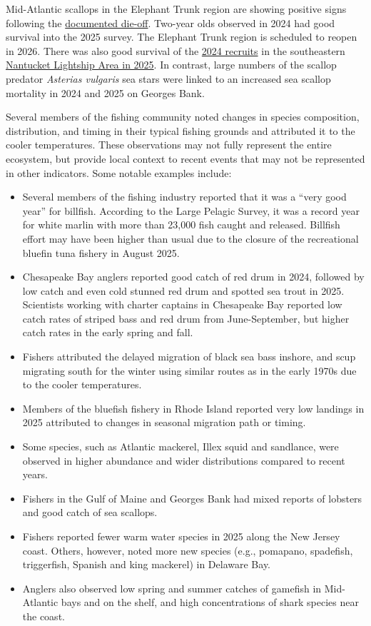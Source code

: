 \documentclass[
  10pt,
]{article}
\providecommand{\tightlist}{%
  \setlength{\itemsep}{0pt}\setlength{\parskip}{0pt}}
\begin{document}
Mid-Atlantic scallops in the Elephant Trunk region are showing positive signs following the \href{https://noaa-edab.github.io/catalog/observation_synthesis_2023.html}{documented die-off}. Two-year olds observed in 2024 had good survival into the 2025 survey. The Elephant Trunk region is scheduled to reopen in 2026. There was also good survival of the \href{https://noaa-edab.github.io/catalog/observation_synthesis_2024.html}{2024 recruits} in the southeastern \href{https://noaa-edab.github.io/catalog/observation_synthesis_2025.html}{Nantucket Lightship Area in 2025}. In contrast, large numbers of the scallop predator \emph{Asterias vulgaris} sea stars were linked to an increased sea scallop mortality in 2024 and 2025 on Georges Bank.

Several members of the fishing community noted changes in species composition, distribution, and timing in their typical fishing grounds and attributed it to the cooler temperatures. These observations may not fully represent the entire ecosystem, but provide local context to recent events that may not be represented in other indicators. Some notable examples include:

\begin{itemize}
\tightlist
\item
  Several members of the fishing industry reported that it was a ``very good year'' for billfish. According to the Large Pelagic Survey, it was a record year for white marlin with more than 23,000 fish caught and released. Billfish effort may have been higher than usual due to the closure of the recreational bluefin tuna fishery in August 2025.
\item
  Chesapeake Bay anglers reported good catch of red drum in 2024, followed by low catch and even cold stunned red drum and spotted sea trout in 2025. Scientists working with charter captains in Chesapeake Bay reported low catch rates of striped bass and red drum from June-September, but higher catch rates in the early spring and fall.
\item
  Fishers attributed the delayed migration of black sea bass inshore, and scup migrating south for the winter using similar routes as in the early 1970s due to the cooler temperatures.
\item
  Members of the bluefish fishery in Rhode Island reported very low landings in 2025 attributed to changes in seasonal migration path or timing.
\item
  Some species, such as Atlantic mackerel, Illex squid and sandlance, were observed in higher abundance and wider distributions compared to recent years.
\item
  Fishers in the Gulf of Maine and Georges Bank had mixed reports of lobsters and good catch of sea scallops.
\item
  Fishers reported fewer warm water species in 2025 along the New Jersey coast. Others, however, noted more new species (e.g., pomapano, spadefish, triggerfish, Spanish and king mackerel) in Delaware Bay.
\item
  Anglers also observed low spring and summer catches of gamefish in Mid-Atlantic bays and on the shelf, and high concentrations of shark species near the coast.
\end{itemize}
\end{document}
